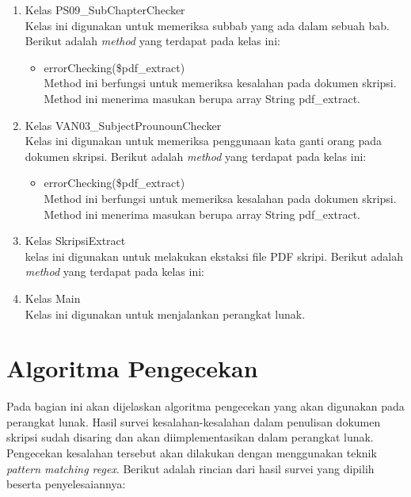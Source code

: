 \begin{enumerate}
	\item Kelas PS09\_SubChapterChecker \\
	Kelas ini digunakan untuk memeriksa subbab yang ada dalam sebuah bab. Berikut adalah \textit{method} yang terdapat pada kelas ini:
			
		\begin{itemize}
			\item errorChecking(\$pdf\_extract) \\
			Method ini berfungsi untuk memeriksa kesalahan pada dokumen skripsi. Method ini menerima masukan berupa array String pdf\_extract.
		\end{itemize}
			
	\item Kelas VAN03\_SubjectProunounChecker \\
	Kelas ini digunakan untuk memeriksa penggunaan kata ganti orang pada dokumen skripsi. Berikut adalah \textit{method} yang terdapat pada kelas ini:
	
		\begin{itemize}
			\item errorChecking(\$pdf\_extract) \\
			Method ini berfungsi untuk memeriksa kesalahan pada dokumen skripsi. Method ini menerima masukan berupa array String pdf\_extract.
		\end{itemize}
			
	\item Kelas SkripsiExtract \\
	kelas ini digunakan untuk melakukan ekstaksi file PDF skripi. Berikut adalah \textit{method} yang terdapat pada kelas ini:
	
	\item Kelas Main \\
	Kelas ini digunakan untuk menjalankan perangkat lunak.

\end{enumerate} 

\section{Algoritma Pengecekan}
Pada bagian ini akan dijelaskan algoritma pengecekan yang akan digunakan pada perangkat lunak. Hasil survei kesalahan-kesalahan dalam penulisan dokumen skripsi sudah disaring dan akan diimplementasikan dalam perangkat lunak. Pengecekan kesalahan tersebut akan dilakukan dengan menggunakan teknik \textit{pattern matching regex}. Berikut adalah rincian dari hasil survei yang dipilih beserta penyelesaiannya:

